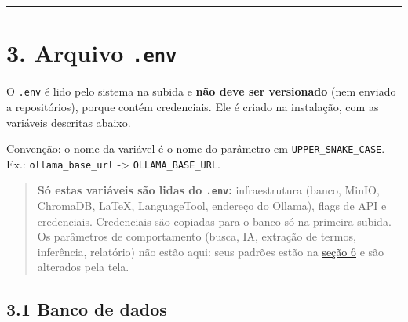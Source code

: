 \documentclass[
  brazilian,
  a4paper,12pt,oneside]{report}
\begin{document}
\begin{center}\rule{0.5\linewidth}{0.5pt}\end{center}

\chapter{\texorpdfstring{3. Arquivo
\texttt{.}\allowbreak{}\texttt{env}}{3. Arquivo .env}}\label{arquivo-.env}

O \texttt{.}\allowbreak{}\texttt{env} é lido pelo sistema na subida e
\textbf{não deve ser versionado} (nem enviado a repositórios), porque
contém credenciais. Ele é criado na instalação, com as variáveis
descritas abaixo.

Convenção: o nome da variável é o nome do parâmetro em
\texttt{UPPER\_}\allowbreak{}\texttt{SNAKE\_}\allowbreak{}\texttt{CASE}.
Ex.:
\texttt{ollama\_}\allowbreak{}\texttt{base\_}\allowbreak{}\texttt{url}
-\textgreater{}
\texttt{OLLAMA\_}\allowbreak{}\texttt{BASE\_}\allowbreak{}\texttt{URL}.

\begin{quote}
\textbf{Só estas variáveis são lidas do
\texttt{.}\allowbreak{}\texttt{env}:} infraestrutura (banco, MinIO,
ChromaDB, LaTeX, LanguageTool, endereço do Ollama), flags de API e
credenciais. Credenciais são copiadas para o banco só na primeira
subida. Os parâmetros de comportamento (busca, IA, extração de termos,
inferência, relatório) não estão aqui: seus padrões estão na
\hyperref[6-paruxe2metros-da-tela-configurauxe7uxf5es]{seção 6} e são
alterados pela tela.
\end{quote}

\section{3.1 Banco de dados}\label{banco-de-dados}
\end{document}

